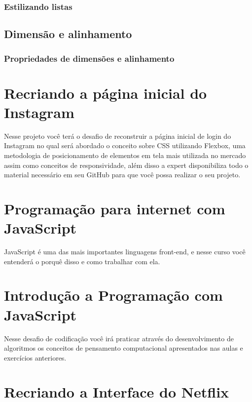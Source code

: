 \documentclass[12pt,a4paper]{article}
\begin{document}
	\subsubsection{Estilizando listas}
	
	
	
	\subsection{Dimensão e alinhamento}
	\subsubsection{Propriedades de dimensões e alinhamento}
	
	
	
	\section{Recriando a página inicial do Instagram}
	
	Nesse projeto você terá o desafio de reconstruir a página inicial de login do Instagram no qual será abordado o conceito sobre CSS utilizando Flexbox, uma metodologia de posicionamento de elementos em tela mais utilizada no mercado assim como conceitos de responsividade, além disso a expert disponibiliza todo o material necessário em seu GitHub para que você possa realizar o seu projeto.
	
	\section{Programação para internet com JavaScript}
	
	JavaScript é uma das mais importantes linguagens front-end, e nesse curso você entenderá o porquê disso e como trabalhar com ela.
	
	\section{Introdução a Programação com JavaScript}
	
	Nesse desafio de codificação você irá praticar através do desenvolvimento de algoritmos os conceitos de pensamento computacional apresentados nas aulas e exercícios anteriores.
	
	\section{Recriando a Interface do Netflix}
	
\end{document}
